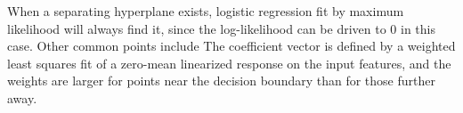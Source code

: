 When a separating hyperplane exists, logistic regression fit by maximum likelihood 
will always find it, since the log-likelihood can be driven to 0 in this case. 
Other common points include The coefficient vector is defined by a
weighted least squares fit of a zero-mean linearized response on the input
features, and the weights are larger for points near the decision boundary
than for those further away. 